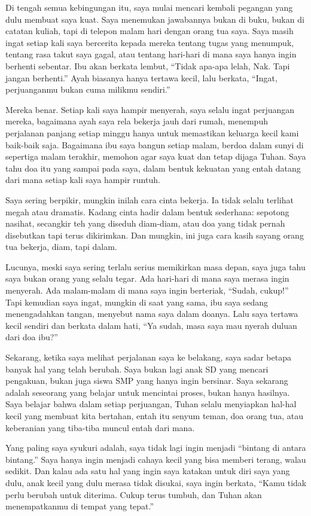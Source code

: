 \documentclass[
  letterpaper,
  DIV=11,
  numbers=noendperiod]{scrreprt}
\begin{document}
Di tengah semua kebingungan itu, saya mulai mencari kembali pegangan
yang dulu membuat saya kuat. Saya menemukan jawabannya bukan di buku,
bukan di catatan kuliah, tapi di telepon malam hari dengan orang tua
saya. Saya masih ingat setiap kali saya bercerita kepada mereka tentang
tugas yang menumpuk, tentang rasa takut saya gagal, atau tentang
hari-hari di mana saya hanya ingin berhenti sebentar. Ibu akan berkata
lembut, ``Tidak apa-apa lelah, Nak. Tapi jangan berhenti.'' Ayah
biasanya hanya tertawa kecil, lalu berkata, ``Ingat, perjuanganmu bukan
cuma milikmu sendiri.''

Mereka benar. Setiap kali saya hampir menyerah, saya selalu ingat
perjuangan mereka, bagaimana ayah saya rela bekerja jauh dari rumah,
menempuh perjalanan panjang setiap minggu hanya untuk memastikan
keluarga kecil kami baik-baik saja. Bagaimana ibu saya bangun setiap
malam, berdoa dalam sunyi di sepertiga malam terakhir, memohon agar saya
kuat dan tetap dijaga Tuhan. Saya tahu doa itu yang sampai pada saya,
dalam bentuk kekuatan yang entah datang dari mana setiap kali saya
hampir runtuh.

Saya sering berpikir, mungkin inilah cara cinta bekerja. Ia tidak selalu
terlihat megah atau dramatis. Kadang cinta hadir dalam bentuk sederhana:
sepotong nasihat, secangkir teh yang diseduh diam-diam, atau doa yang
tidak pernah disebutkan tapi terus dikirimkan. Dan mungkin, ini juga
cara kasih sayang orang tua bekerja, diam, tapi dalam.

Lucunya, meski saya sering terlalu serius memikirkan masa depan, saya
juga tahu saya bukan orang yang selalu tegar. Ada hari-hari di mana saya
merasa ingin menyerah. Ada malam-malam di mana saya ingin berteriak,
``Sudah, cukup!'' Tapi kemudian saya ingat, mungkin di saat yang sama,
ibu saya sedang menengadahkan tangan, menyebut nama saya dalam doanya.
Lalu saya tertawa kecil sendiri dan berkata dalam hati, ``Ya sudah, masa
saya mau nyerah duluan dari doa ibu?''

Sekarang, ketika saya melihat perjalanan saya ke belakang, saya sadar
betapa banyak hal yang telah berubah. Saya bukan lagi anak SD yang
mencari pengakuan, bukan juga siswa SMP yang hanya ingin bersinar. Saya
sekarang adalah seseorang yang belajar untuk mencintai proses, bukan
hanya hasilnya. Saya belajar bahwa dalam setiap perjuangan, Tuhan selalu
menyiapkan hal-hal kecil yang membuat kita bertahan, entah itu senyum
teman, doa orang tua, atau keberanian yang tiba-tiba muncul entah dari
mana.

Yang paling saya syukuri adalah, saya tidak lagi ingin menjadi ``bintang
di antara bintang.'' Saya hanya ingin menjadi cahaya kecil yang bisa
memberi terang, walau sedikit. Dan kalau ada satu hal yang ingin saya
katakan untuk diri saya yang dulu, anak kecil yang dulu merasa tidak
disukai, saya ingin berkata, ``Kamu tidak perlu berubah untuk diterima.
Cukup terus tumbuh, dan Tuhan akan menempatkanmu di tempat yang tepat.''
\end{document}
